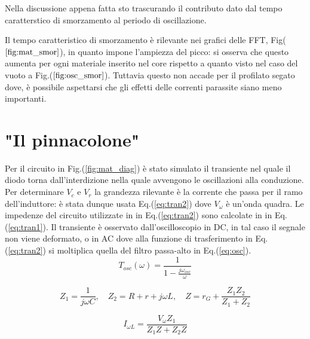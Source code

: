 \documentclass{article}
\begin{document}
        Nella discussione appena fatta sto trascurando il contributo dato dal 
        tempo caratterstico di smorzamento al periodo di oscillazione.
        
        Il tempo caratteristico di smorzamento è rilevante nei grafici 
        delle FFT, Fig($\ref{fig:mat_smor}$), in quanto impone l'ampiezza del picco:
        si osserva che questo aumenta per ogni materiale inserito nel core 
        rispetto a quanto visto nel caso  del vuoto a Fig.($\ref{fig:osc_smor}$).
        Tuttavia questo non accade per il profilato segato dove, è possibile  
        aspettarsi che gli effetti delle correnti parassite siano meno importanti.

        





\section{"Il pinnacolone"}
    Per il circuito in Fig.(\ref{fig:mat_diag}) è stato simulato il transiente nel quale 
    il diodo torna dall'interdizione nella quale avvengono le oscillazioni alla conduzione.
    Per determinare $V_c$ e $V_r$ la grandezza rilevante è la corrente che passa per il 
    ramo dell'induttore: è stata dunque usata Eq.(\ref{eq:tran2}) dove $V_{\omega}$ è un'onda quadra.
    Le impedenze del circuito utilizzate in in Eq.(\ref{eq:tran2}) sono calcolate
    in in Eq.(\ref{eq:tran1}).
    Il transiente è osservato dall'oscilloscopio in DC, in tal caso il segnale non viene 
    deformato, o in AC dove alla funzione di trasferimento in Eq.(\ref{eq:tran2}) si 
    moltiplica quella del filtro passa-alto in Eq.(\ref{eq:osc}).
        \begin{equation}
            T_{osc}(\omega)=\frac{1}{1-\frac{j\omega_{osc}}{\omega}}        
            \label{eq:osc}
        \end{equation}
    
        \begin{equation}
            Z_1=\frac{1}{j \omega C}, \quad Z_2= R + r + j \omega L, \quad 
            Z=r_{G}+\frac{Z_1 Z_2}{Z_1 +Z_2}
            \label{eq:tran1}
        \end{equation}
        
        \begin{equation}
            I_{\omega L}=\frac{V_{\omega} Z_1}{Z_1 Z + Z_2 Z} 
            \label{eq:tran2}
        \end{equation}
\end{document}

